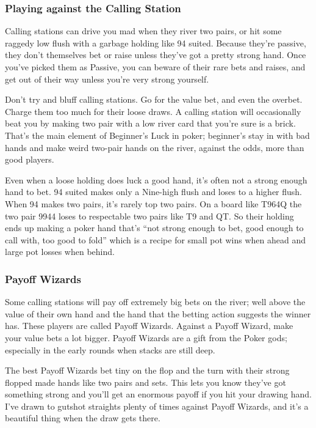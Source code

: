 \subsubsection{Playing against the Calling Station}

Calling stations can drive you mad when they river two pairs,
or hit some raggedy low flush with a garbage holding like 94 suited.
Because they're passive, they don't themselves bet or raise unless
they've got a pretty strong hand. Once you've picked them as
Passive, you can beware of their rare bets and raises, and get out of
their way unless you're very strong yourself.

Don't try and bluff calling stations. Go for the value bet,
and even the overbet. Charge them too much for their loose draws.
A calling station will occasionally beat you by making two pair with a
low river card that you're sure is a brick. That's the main element of
Beginner's Luck in poker; beginner's stay in with bad hands and make
weird two-pair hands on the river, against the odds, more than good
players.

Even when a loose holding does luck a good hand, it's often
not a strong enough hand to bet. 94 suited makes only a Nine-high
flush and loses to a higher flush. When 94 makes two pairs,
it's rarely top two pairs. On a board like T964Q the two pair 9944
loses to respectable two pairs like T9 and QT. So their
holding ends up making a poker hand that's ``not strong enough to bet,
good enough to call with, too good to fold'' which is a recipe for
small pot wins when ahead and large pot losses when behind.

\subsubsection{Payoff Wizards}

Some calling stations will pay off extremely big bets on the river; well
above the value of their own hand and the hand that the betting action
suggests the winner has. These players are called Payoff
Wizards. Against a Payoff Wizard, make your value bets a
lot bigger. Payoff Wizards are a gift from the
Poker gods; especially in the early rounds when stacks are still
deep.

The best Payoff Wizards bet tiny on the flop and the
turn with their strong flopped made hands like two pairs and sets.
This lets you know they've got something strong and you'll
get an enormous payoff if you hit your drawing hand. I've drawn to
gutshot straights plenty of times against Payoff Wizards, and it's a
beautiful thing when the draw gets there.

